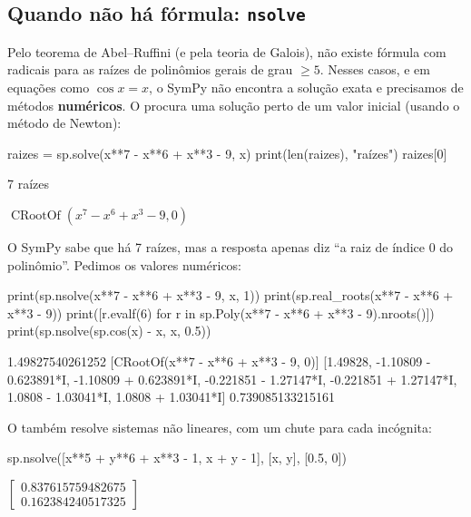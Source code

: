 \subsection{Quando não há fórmula: \texttt{nsolve}}

Pelo teorema de Abel--Ruffini (e pela teoria de Galois), não existe fórmula com radicais para as raízes de
polinômios gerais de grau $\ge5$. Nesses casos, e em equações como $\cos x = x$, o SymPy não encontra a solução
exata e precisamos de métodos \textbf{numéricos}. O  procura uma solução perto de
um valor inicial (usando o método de Newton):

\begin{entrada}
raizes = sp.solve(x**7 - x**6 + x**3 - 9, x)
print(len(raizes), "raízes")
raizes[0]
\end{entrada}
\begin{saida}
7 raízes
\end{saida}
\begin{saidamat}
$\displaystyle \operatorname{CRootOf} {\left(x^{7} - x^{6} + x^{3} - 9, 0\right)}$
\end{saidamat}

O SymPy sabe que há 7 raízes, mas a resposta apenas diz ``a raiz de índice 0 do polinômio''. Pedimos os valores numéricos:

\begin{entrada}
print(sp.nsolve(x**7 - x**6 + x**3 - 9, x, 1))
print(sp.real_roots(x**7 - x**6 + x**3 - 9))
print([r.evalf(6) for r in sp.Poly(x**7 - x**6 + x**3 - 9).nroots()])
print(sp.nsolve(sp.cos(x) - x, x, 0.5))
\end{entrada}
\begin{saida}
1.49827540261252
[CRootOf(x**7 - x**6 + x**3 - 9, 0)]
[1.49828, -1.10809 - 0.623891*I, -1.10809 + 0.623891*I, -0.221851 - 1.27147*I, -0.221851 + 1.27147*I, 1.0808 - 1.03041*I, 1.0808 + 1.03041*I]
0.739085133215161
\end{saida}

O  também resolve sistemas não lineares, com um chute para cada incógnita:

\begin{entrada}
sp.nsolve([x**5 + y**6 + x**3 - 1, x + y - 1], [x, y], [0.5, 0])
\end{entrada}
\begin{saidamat}
$\displaystyle \left[\begin{matrix}0.837615759482675\\0.162384240517325\end{matrix}\right]$
\end{saidamat}

